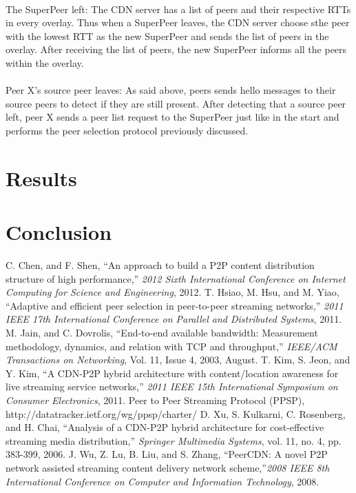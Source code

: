 \documentclass[letterpaper, twocolumn, twoside]{IEEEtran}
\begin{document}
\paragraph{}
The SuperPeer left: The CDN server has a list of peers and their respective RTTs in every overlay. Thus when a SuperPeer leaves, the CDN server choose sthe peer with the lowest RTT as the new SuperPeer and sends the list of peers in the overlay. After receiving the list of peers, the new SuperPeer informs all the peers within the overlay.
\paragraph{}
Peer X’s source peer leaves: As said above, peers sends hello messages to their source peers to detect if they are still present. After detecting that a source peer left, peer X sends a peer list request to the SuperPeer just like in the start and performs the peer selection protocol previously discussed.
\section{Results}

\section{Conclusion}
\begin{thebibliography}{7}
C. Chen, and F. Shen, ``An approach to build a P2P content distribution structure of high performance,'' \textit{2012 Sixth International Conference on Internet Computing for Science and Engineering}, 2012.
T. Hsiao, M. Hsu, and M. Yiao, ``Adaptive and efficient peer selection in peer-to-peer streaming networks,'' \textit{2011 IEEE 17th International Conference on Parallel and Distributed Systems}, 2011.
M. Jain, and C. Dovrolis, ``End-to-end available bandwidth: Measurement methodology, dynamics, and relation with TCP and throughput,'' \textit{IEEE/ACM Transactions on Networking}, Vol. 11, Issue 4, 2003, August.
T. Kim, S. Jeon, and Y. Kim, ``A CDN-P2P hybrid architecture with content/location awareness for live streaming service networks,'' \textit{2011 IEEE 15th International Symposium on Consumer Electronics}, 2011.
Peer to Peer Streaming Protocol (PPSP), http://datatracker.ietf.org/wg/ppsp/charter/  
\bibitem{]xu-etal} 
D. Xu, S. Kulkarni, C. Rosenberg, and H. Chai, ``Analysis of a CDN-P2P hybrid architecture for cost-effective streaming media distribution,'' \textit{Springer Multimedia Systems}, vol. 11, no. 4, pp. 383-399, 2006.  
J. Wu, Z. Lu, B. Liu, and S. Zhang, ``PeerCDN: A novel P2P network assisted streaming content delivery network scheme,''\textit{2008 IEEE 8th International Conference on Computer and Information Technology}, 2008.

\end{thebibliography}
\end{document}
